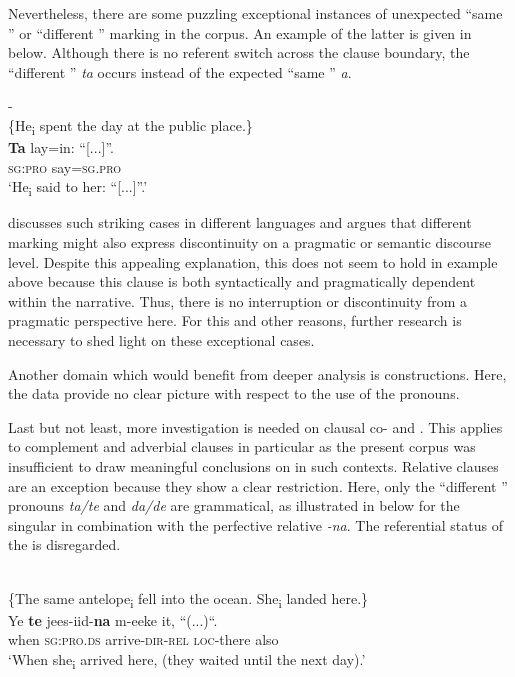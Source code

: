 \documentclass[output=paper,newtxmath,modfonts,nonflat,hidelinks]{langsci/langscibook}
\begin{document}
Nevertheless, there are some puzzling exceptional instances of unexpected “same ” or “different ” marking in the corpus. An example of the latter is given in  below. Although there is no referent switch across the clause boundary, the “different ”  \textit{ta} occurs instead of the expected “same ”  \textit{a}.

\ea\label{ex:apel:23}
{- \citep[284]{Faye1979}}\\
{\-\hspace{0cm}\{He\textsubscript{i} spent the day at the public place.\}}\\
\gll   \textbf{Ta} lay=in: “[...]”. \\
     \textsc{sg:pro} say\textsc{=sg.pro} \\
\glt ‘He\textsubscript{i} said to her: “[...]”.’
\z

\citet[98-114]{Stirling1993} discusses such striking cases in different languages and argues that different  marking might also express discontinuity on a pragmatic or semantic discourse level. Despite this appealing explanation, this does not seem to hold in example  above because this clause is both syntactically and pragmatically dependent within the narrative. Thus, there is no interruption or discontinuity from a pragmatic perspective here. For this and other reasons, further research is necessary to shed light on these exceptional cases.

Another domain which would benefit from deeper analysis is  constructions. Here, the data provide no clear picture with respect to the use of the  pronouns.

Last but not least, more investigation is needed on clausal co- and . This applies to complement and adverbial clauses in particular as the present corpus was insufficient to draw meaningful conclusions on  in such contexts. Relative clauses are an exception because they show a clear restriction. Here, only the “different ” pronouns \textit{ta/te} and \textit{da/de} are grammatical, as illustrated in  below for the singular in combination with the perfective relative \textit{-na}. The referential status of the  is disregarded.

\newpage 
\ea\label{ex:apel:24}
{  \citep[350]{Renaudier2012}}\\
{\-\hspace{0cm}\{The same antelope\textsubscript{i} fell into the ocean. She\textsubscript{i} landed here.\}} \\
\gll   Ye \textbf{te} jees-iid-\textbf{na} m-eeke it, “(...)“.\\
     when \textsc{sg:pro.ds} arrive\textsc{-dir-rel} \textsc{loc-}there also \\
\glt ‘When she\textsubscript{i} arrived here, (they waited until the next day).’
\z
\end{document}
